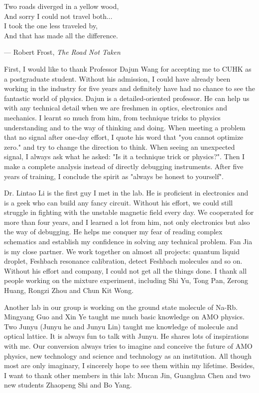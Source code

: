 \setlength{\unitlength}{1pt}
\setlength{\epigraphwidth}{10cm}
\epigraph{Two roads diverged in a yellow wood,\\And sorry I could not travel both...\\I took the one less traveled by,\\
And that has made all the difference.}{ --- Robert Frost, \textit{The Road Not Taken}}

First, I would like to thank Professor Dajun Wang for accepting me to CUHK as a postgraduate student. Without his admission, I could have already been working in the industry for five years and definitely have had no chance to see the fantastic world of physics. Dajun is a detailed-oriented professor. He can help us with any technical detail when we are freshmen in optics, electronics and mechanics. I learnt so much from him, from technique tricks to physics understanding and to the way of thinking and doing. When meeting a problem that no signal after one-day effort, I quote his word that "you cannot optimize zero." and try to change the direction to think. When seeing an unexpected signal, I always ask what he asked: "Is it a technique trick or physics?". Then I make a complete analysis instead of directly debugging instruments. After five years of training, I conclude the spirit as "always be honest to yourself".

Dr. Lintao Li is the first guy I met in the lab. He is proficient in electronics and is a geek who can build any fancy circuit. Without his effort, we could still struggle in fighting with the unstable magnetic field every day. We cooperated for more than four years, and I learned a lot from him, not only electronics but also the way of debugging. He helps me conquer my fear of reading complex schematics and establish my confidence in solving any technical problem. 
Fan Jia is my close partner. We work together on almost all projects: quantum liquid droplet, Feshbach resonance calibration, detect Feshbach molecules and so on. Without his effort and company, I could not get all the things done.
I thank all people working on the mixture experiment, including Shi Yu, Tong Pan, Zerong Huang, Rongzi Zhou and Chun Kit Wong.

Another lab in our group is working on the ground state molecule of Na-Rb. Mingyang Guo and Xin Ye taught me much basic knowledge on AMO physics. Two Junyu (Junyu he and Junyu Lin) taught me knowledge of molecule and optical lattice. It is always fun to talk with Junyu. He shares lots of inspirations with me. Our conversion always tries to imagine and conceive the future of AMO physics, new technology and science and technology as an institution. All though most are only imaginary, I sincerely hope to see them within my lifetime. Besides, I want to thank other members in this lab: Mucan Jin, Guanghua Chen and two new students Zhaopeng Shi and Bo Yang. 

